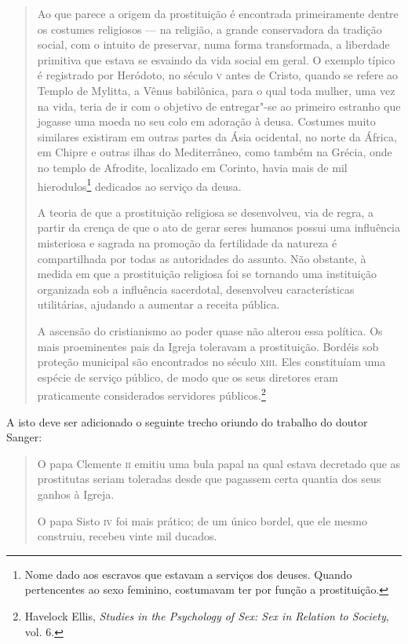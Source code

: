 \begin{quote}
Ao que parece a origem da prostituição é encontrada
primeiramente dentre os costumes religiosos --- na religião, a grande
conservadora da tradição social, com o intuito de preservar, numa forma transformada, a
liberdade primitiva que estava se esvaindo da vida social em geral. O
exemplo típico é registrado por Heródoto, no século \textsc{v} antes de Cristo,
quando se refere ao Templo de Mylitta, a Vênus babilônica, para o qual toda mulher,
uma vez na vida, teria de ir com o objetivo de entregar"-se ao primeiro estranho que jogasse uma
moeda no seu colo em adoração à deusa. Costumes muito similares
existiram em outras partes da Ásia ocidental, no norte da África, em
Chipre e outras ilhas do Mediterrâneo, como também na Grécia, onde no
templo de Afrodite, localizado em Corinto, havia mais de mil
hierodulos\footnote{Nome dado aos escravos que estavam a serviços dos
  deuses. Quando pertencentes ao sexo feminino, costumavam
  ter por função a prostituição.}
dedicados ao serviço da deusa.

A teoria de que a prostituição religiosa se desenvolveu, via de regra,
a partir da crença de que o ato de gerar seres humanos possui uma
influência misteriosa e sagrada na promoção da fertilidade da natureza
é compartilhada por todas as autoridades do assunto. Não obstante, à
medida em que a prostituição religiosa foi se tornando uma instituição
organizada sob a influência sacerdotal, desenvolveu características
utilitárias, ajudando a aumentar a receita pública.

A ascensão do cristianismo ao poder quase não
alterou essa política. Os mais proeminentes pais da Igreja toleravam a
prostituição. Bordéis sob proteção municipal são encontrados no século
\textsc{xiii}. Eles constituíam uma espécie de serviço público, de modo que os
seus diretores eram praticamente considerados servidores
públicos.\footnote{Havelock Ellis,
  \textit{Studies in the Psychology of Sex: Sex in Relation to Society},
  vol. 6.}
  \end{quote}

A isto deve ser adicionado o seguinte trecho oriundo do trabalho do
doutor Sanger:

\begin{quote}
O papa Clemente \textsc{ii} emitiu uma bula papal na qual estava decretado que
as prostitutas seriam toleradas desde que pagassem certa quantia dos
seus ganhos à Igreja.

O papa Sisto \textsc{iv} foi mais prático; de um único bordel, que ele mesmo
construiu, recebeu vinte mil ducados.
\end{quote}


